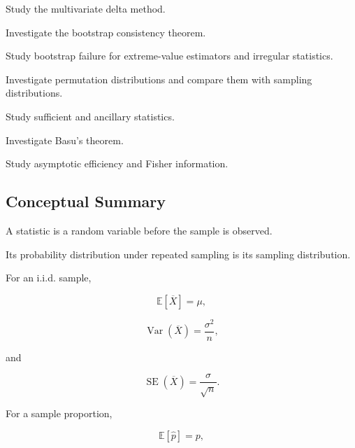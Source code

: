 \begin{exercise}[4]
Study the multivariate delta method.
\end{exercise}

\begin{exercise}[4]
Investigate the bootstrap consistency theorem.
\end{exercise}

\begin{exercise}[4]
Study bootstrap failure for extreme-value estimators and irregular
statistics.
\end{exercise}

\begin{exercise}[4]
Investigate permutation distributions and compare them with sampling
distributions.
\end{exercise}

\begin{exercise}[4]
Study sufficient and ancillary statistics.
\end{exercise}

\begin{exercise}[4]
Investigate Basu's theorem.
\end{exercise}

\begin{exercise}[4]
Study asymptotic efficiency and Fisher information.
\end{exercise}

\subsection{Conceptual Summary}
\label{subsec:sampling-distribution-summary}

A statistic is a random variable before the sample is observed.

Its probability distribution under repeated sampling is its sampling
distribution.

For an i.i.d. sample,

\[
\boxed{
\mathbb{E}[\overline{X}]
=
\mu,
}
\]

\[
\boxed{
\operatorname{Var}(\overline{X})
=
\frac{\sigma^2}{n},
}
\]

and

\[
\boxed{
\operatorname{SE}(\overline{X})
=
\frac{\sigma}{\sqrt{n}}.
}
\]

For a sample proportion,

\[
\boxed{
\mathbb{E}[\widehat{p}]
=
p,
}
\]

